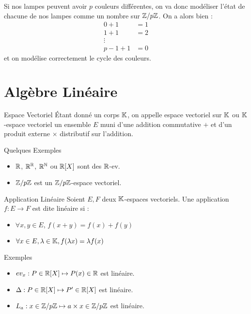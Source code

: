 \documentclass{cours}
\begin{document}
    Si nos lampes peuvent avoir $p$ couleurs différentes, on va donc modéliser l'état de chacune de nos lampes comme un nombre sur $\mathbb{Z}/p\mathbb{Z}$. On a alors bien :
    \[
        \begin{aligned}
            0 + 1   & = 1 \\
            1 + 1   & = 2 \\
            \vdots  &     \\
            p-1 + 1 & = 0
        \end{aligned}
    \]
    et on modélise correctement le cycle des couleurs.

\section{Algèbre Linéaire}
\begin{définition}{Espace Vectoriel}{}
Étant donné un corps $\mathbb{K}$, on appelle espace vectoriel sur $\mathbb{K}$ ou $\mathbb{K}$-espace vectoriel un ensemble $E$ muni d'une addition commutative $+$ et d'un produit externe $\times$ distributif sur l'addition.
\end{définition}
\begin{propositionfr}{Quelques Exemples}{}
        \begin{itemize}
            \item $\mathbb{R}$, $\mathbb{R}^{\mathbb{R}}$, $\mathbb{R}^{\mathbb{N}}$ ou $\mathbb{R}[X]$ sont des $\mathbb{R}$-ev.
            \item $\mathbb{Z}/p\mathbb{Z}$ est un $\mathbb{Z}/p\mathbb{Z}$-espace vectoriel.
        \end{itemize}
    \end{propositionfr}

\begin{définition}{Application Linéaire}{}
Soient $E, F$ deux $\mathbb{K}$-espaces vectoriels. Une application $f : E \to F$ est dite linéaire si :
\begin{itemize}
    \item $\forall x, y \in E$, $f(x + y) = f(x) + f(y)$
    \item $\forall x \in E, \lambda \in \mathbb{K}, f(\lambda x) = \lambda f(x)$
\end{itemize}
\end{définition}


    \begin{propositionfr}{Exemples}{}
        \begin{itemize}
            \item $ev_{x} : P \in \mathbb{R}[X] \mapsto P(x) \in \mathbb{R}$ est linéaire.
            \item $\Delta : P \in \mathbb{R}[X] \mapsto P' \in \mathbb{R}[X]$ est linéaire.
            \item $L_{a} : x \in \mathbb{Z}/p\mathbb{Z} \mapsto a \times x \in \mathbb{Z}/p\mathbb{Z}$ est linéaire.
        \end{itemize}
    \end{propositionfr}
\end{document}
